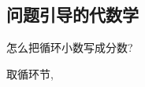 \subsection{问题引导的代数学}

\begin{prob} 

  怎么把循环小数写成分数?

\end{prob} 

\begin{sol} 
取循环节,  
 
\end{sol} 
